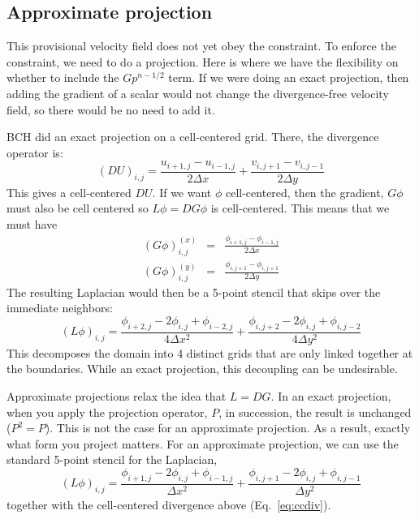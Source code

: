 \subsection{Approximate projection}

This provisional velocity field does not yet obey the constraint.  To
enforce the constraint, we need to do a projection.  Here is where we
have the flexibility on whether to include the $G p^{n-1/2}$ term.  If
we were doing an exact projection, then adding the gradient of a
scalar would not change the divergence-free velocity field, so there
would be no need to add it.  

BCH did an exact projection on a cell-centered grid.  There, the
divergence operator is:
\begin{equation}
(D U)_{i,j} = \frac{u_{i+1,j} - u_{i-1,j}}{2\Delta x} +
              \frac{v_{i,j+1} - v_{i,j-1}}{2\Delta y} \label{eq:ccdiv}
\end{equation}
This gives a cell-centered $DU$.  If we want $\phi$ cell-centered, then
the gradient, $G\phi$ must also be cell centered so $L\phi = DG\phi$ is 
cell-centered.  This means that we must have
\begin{eqnarray}
(G\phi)^{(x)}_{i,j} &=& \frac{\phi_{i+1,j} - \phi_{i-1,j}}{2\Delta x} \\
(G\phi)^{(y)}_{i,j} &=& \frac{\phi_{i,j+1} - \phi_{i,j+1}}{2\Delta y}
\end{eqnarray}
The resulting Laplacian would then be a 5-point stencil that skips over
the immediate neighbors:
\begin{equation}
(L\phi)_{i,j} = \frac{\phi_{i+2,j} -2\phi_{i,j} + \phi_{i-2,j}}{4 \Delta x^2} +
    \frac{\phi_{i,j+2} -2\phi_{i,j} + \phi_{i,j-2}}{4 \Delta y^2}
\end{equation}
This decomposes the domain into 4 distinct grids that are only linked 
together at the boundaries.  While an exact projection, this decoupling
can be undesirable.

Approximate projections relax the idea that $L = DG$.  In an exact
projection, when you apply the projection operator, $P$, in
succession, the result is unchanged ($P^2 = P$).  This is not the case
for an approximate projection.  As a result, exactly what form you
project matters.  For an approximate projection, we can use the 
standard 5-point stencil for the Laplacian,
\begin{equation}
(L\phi)_{i,j} = \frac{\phi_{i+1,j} -2\phi_{i,j} + \phi_{i-1,j}}{\Delta x^2} +
    \frac{\phi_{i,j+1} -2\phi_{i,j} + \phi_{i,j-1}}{\Delta y^2}
\end{equation}
together with the cell-centered divergence above (Eq.~\ref{eq:ccdiv}).


